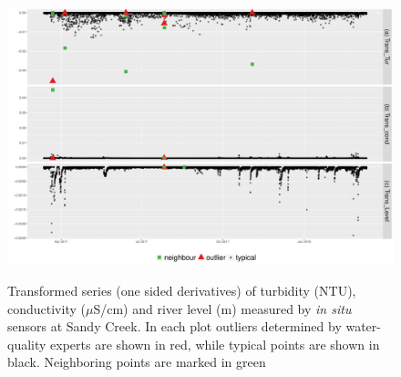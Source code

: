 \documentclass[draft]{agujournal2018} %
\begin{document}
\begin{figure}[H]

{\centering \includegraphics[width=1\textwidth]{./fig/transDemoTCLtrans-1.pdf}
}

\caption{Transformed series (one sided derivatives) of turbidity (NTU), conductivity ($\mu$S/cm) and river level (m) measured by \textit{in situ} sensors at Sandy Creek. In each plot outliers determined by water-quality experts are shown in red, while typical points are shown in black. \color{black} Neighboring points are marked in green \color{black}}\label{fig:transDemoTCLpng}
\end{figure}
\end{document}
